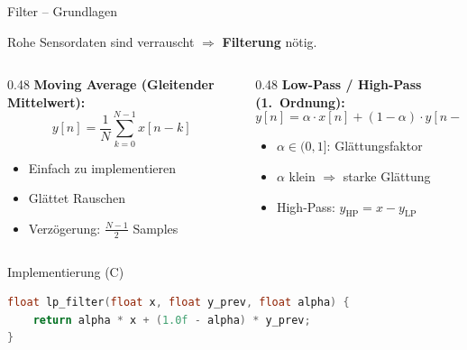 \documentclass[%
  aspectratio=169,
  10pt
]{beamer}
\newcommand{\hl}[1]{{\color{fbblau}\textbf{#1}}}
\begin{document}
\begin{frame}[fragile]{Filter -- Grundlagen}

Rohe Sensordaten sind verrauscht $\Rightarrow$ \hl{Filterung} nötig.

\vspace{3mm}
\begin{columns}[T]
  \begin{column}{0.48\textwidth}
    \textbf{Moving Average (Gleitender Mittelwert):}
    \[
      y[n] = \frac{1}{N}\sum_{k=0}^{N-1} x[n-k]
    \]
    \begin{itemize}
      \item Einfach zu implementieren
      \item Glättet Rauschen
      \item Verzögerung: $\frac{N-1}{2}$ Samples
    \end{itemize}
  \end{column}
  \begin{column}{0.48\textwidth}
    \textbf{Low-Pass / High-Pass (1.\ Ordnung):}
    \[
      y[n] = \alpha \cdot x[n] + (1-\alpha) \cdot y[n-1]
    \]
    \begin{itemize}
      \item $\alpha \in (0,1]$: Glättungsfaktor
      \item $\alpha$ klein $\Rightarrow$ starke Glättung
      \item High-Pass: $y_\mathrm{HP} = x - y_\mathrm{LP}$
    \end{itemize}
  \end{column}
\end{columns}

\vspace{3mm}
\begin{exampleblock}{Implementierung (C)}
\begin{lstlisting}[language=C, numbers=none, frame=none, backgroundcolor={}]
float lp_filter(float x, float y_prev, float alpha) {
    return alpha * x + (1.0f - alpha) * y_prev;
}
\end{lstlisting}
\vspace{-2mm}
\end{exampleblock}

\end{frame}
\end{document}

